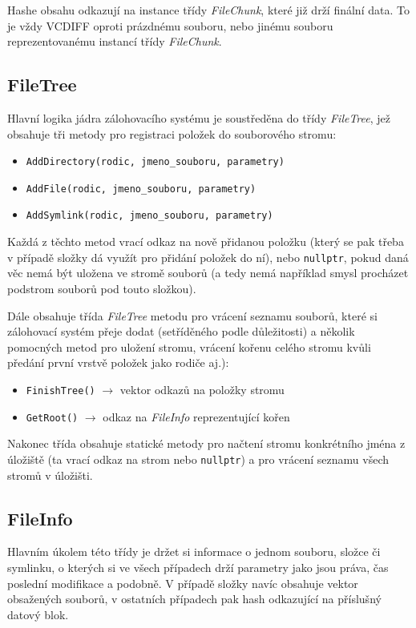 Hashe obsahu odkazují na instance třídy {\it FileChunk}, které již drží finální
data. To je vždy \gls{VCDIFF} oproti prázdnému souboru, nebo jinému souboru
reprezentovanému instancí třídy {\it FileChunk}.

\subsection{FileTree}

Hlavní logika jádra zálohovacího systému je soustředěna do třídy {\it FileTree},
jež obsahuje tři metody pro registraci položek do souborového stromu:

\begin{itemize}
	\item\texttt{AddDirectory(rodic, jmeno\_souboru, parametry)}
	\item\texttt{AddFile(rodic, jmeno\_souboru, parametry)}
	\item\texttt{AddSymlink(rodic, jmeno\_souboru, parametry)}
\end{itemize}

Každá z těchto metod vrací odkaz na nově přidanou položku (který se pak třeba
v případě složky dá využít pro přidání položek do ní), nebo \texttt{nullptr},
pokud daná věc nemá být uložena ve stromě souborů (a tedy nemá například smysl
procházet podstrom souborů pod touto složkou).

Dále obsahuje třída {\it FileTree} metodu pro vrácení seznamu souborů, které si
zálohovací systém přeje dodat (setříděného podle důležitosti) a několik
pomocných metod pro uložení stromu, vrácení kořenu celého stromu kvůli předání
první vrstvě položek jako rodiče aj.):

\begin{itemize}
	\item\texttt{FinishTree()} $\rightarrow$ vektor odkazů na položky stromu
	\item\texttt{GetRoot()} $\rightarrow$ odkaz na {\it FileInfo}
	reprezentující kořen
\end{itemize}

Nakonec třída obsahuje statické metody pro načtení stromu konkrétního jména
z úložiště (ta vrací odkaz na strom nebo \texttt{nullptr}) a pro vrácení seznamu
všech stromů v úložišti.

\subsection{FileInfo}

Hlavním úkolem této třídy je držet si informace o jednom souboru, složce či
symlinku, o kterých si ve všech případech drží parametry jako jsou práva, čas
poslední modifikace a podobně. V případě složky navíc obsahuje vektor obsažených
souborů, v ostatních případech pak hash odkazující na příslušný datový blok.

